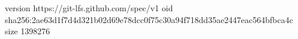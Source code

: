 version https://git-lfs.github.com/spec/v1
oid sha256:2ae63d1f7d4d321b02d69e78dcc0f75c30a94f718dd35ae2447eac564bfbca4c
size 1398276
